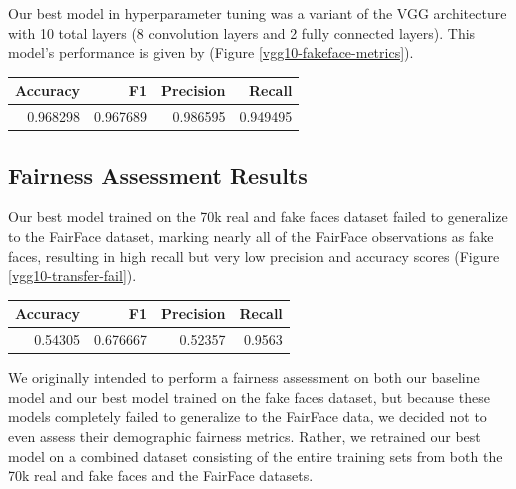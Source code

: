 \documentclass[11pt, letterpaper]{article}
\newenvironment{Figure}
  {\par\medskip\noindent\minipage{\linewidth}}
  {\endminipage\par\medskip}
\begin{document}
\begin{multicols}{2}
  Our best model in hyperparameter tuning was a variant of the VGG architecture
  \cite{simonyan2015deep} with 10 total layers (8 convolution layers and 2 fully
  connected layers). This model's performance is given by
  (Figure \ref{vgg10-fakeface-metrics}).

  \begin{Figure}
    \centering
    \label{vgg10-fakeface-metrics}
    \begin{tabular}{rrrr}
    \toprule
     Accuracy &        F1 &  Precision &    Recall \\
    \midrule
     0.968298 &  0.967689 &   0.986595 &  0.949495 \\
    \bottomrule
    \end{tabular}
  \end{Figure}


  \subsection{Fairness Assessment Results}

  Our best model trained on the 70k real and fake faces dataset failed to
  generalize to the FairFace dataset, marking nearly all of the FairFace
  observations as fake faces, resulting in high recall but very low precision
  and accuracy scores (Figure \ref{vgg10-transfer-fail}).

  \begin{Figure}
    \centering
    \label{vgg10-transfer-fail}
    \begin{tabular}{rrrr}
    \toprule
    Accuracy &        F1 &  Precision &  Recall \\
    \midrule
      0.54305 &  0.676667 &    0.52357 &  0.9563 \\
    \bottomrule
    \end{tabular}
  \end{Figure}

  We originally intended to perform a fairness assessment on both our baseline
  model and our best model trained on the fake faces dataset, but because
  these models completely failed to generalize to the FairFace data,
  we decided not to even assess their demographic fairness metrics. Rather, we
  retrained our best model on a combined dataset consisting of the entire
  training sets from both the 70k real and fake faces and the FairFace datasets.


\end{multicols}
\end{document}
